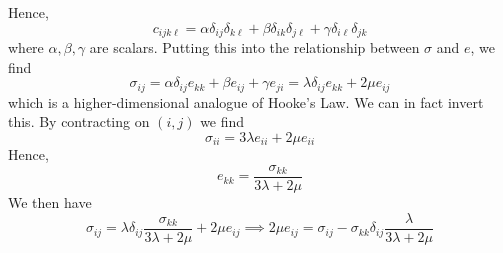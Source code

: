 Hence,
\[
	c_{ijk\ell} = \alpha \delta_{ij}\delta_{k\ell} + \beta \delta_{ik}\delta_{j\ell} + \gamma \delta_{i\ell}\delta_{jk}
\]
where \(\alpha, \beta, \gamma\) are scalars.
Putting this into the relationship between \(\sigma\) and \(e\), we find
\[
	\sigma_{ij} = \alpha \delta_{ij}e_{kk} + \beta e_{ij} + \gamma e_{ji} = \lambda \delta_{ij} e_{kk} + 2\mu e_{ij}
\]
which is a higher-dimensional analogue of Hooke's Law.
We can in fact invert this.
By contracting on \((i, j)\) we find
\[
	\sigma_{ii} = 3\lambda e_{ii} + 2\mu e_{ii}
\]
Hence,
\[
	e_{kk} = \frac{\sigma_{kk}}{3\lambda + 2\mu}
\]
We then have
\[
	\sigma_{ij} = \lambda \delta_{ij} \frac{\sigma_{kk}}{3\lambda + 2\mu} + 2\mu e_{ij} \implies 2\mu e_{ij} = \sigma_{ij} - \sigma_{kk} \delta_{ij} \frac{\lambda}{3\lambda + 2\mu}
\]
